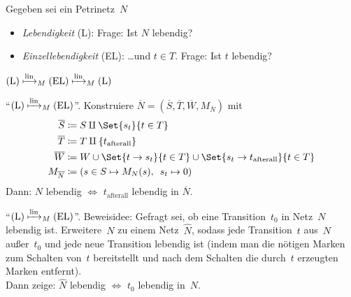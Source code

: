 \documentclass{cheat-sheet}
\newcommand{\reducesManyOneToLin}{\xmapsto{\mathrm{lin}}_M} %
\begin{document}
\begin{probleme}
  Gegeben sei ein Petrinetz~$N$
  \begin{itemize}
    \item \emph{Lebendigkeit} (L): 
      Frage: Ist $N$ lebendig?
    \item \emph{Einzellebendigkeit} (EL):
      \ldots und $t \in T$.
      Frage: Ist $t$ lebendig?
  \end{itemize}
\end{probleme}


\begin{satz}
  $\text{(L)} \reducesManyOneToLin \text{(EL)} \reducesManyOneToLin \text{(L)}$
\end{satz}

\begin{beweis}
  "`$\text{(L)} \reducesManyOneToLin \text{(EL)}$"'.
  Konstruiere $\overline{N} = (\overline{S}, \overline{T}, \overline{W}, M_{\overline{N}})$ mit
  \begin{align*}
    \overline{S} & \coloneqq S \amalg \Set{s_t}{t \in T} \\
    \overline{T} & \coloneqq T \amalg \{ t_\mathrm{afterall} \} \\
    \overline{W} & \coloneqq W \cup \Set{t \to s_t}{t \in T} \cup \Set{s_t \to t_\mathrm{afterall}}{t \in T} \\
    M_{\overline{N}} & \coloneqq (s \in S \mapsto M_N(s), \enspace s_t \mapsto 0)
  \end{align*}
  Dann: $N$ lebendig $\iff$ $t_\mathrm{afterall}$ lebendig in $\overline{N}$.
  
  \begin{center}\end{center}

  "`$\text{(L)} \reducesManyOneToLin \text{(EL)}$"'.
  Beweisidee: 
  Gefragt sei, ob eine Transition~$t_0$ in Netz~$N$ lebendig ist.
  Erweitere~$N$ zu einem Netz~$\hat{N}$, sodass jede Transition~$t$ aus~$N$ außer~$t_0$ und jede neue Transition lebendig ist (indem man die nötigen Marken zum Schalten von~$t$ bereitstellt und nach dem Schalten die durch~$t$ erzeugten Marken entfernt). \\
  Dann zeige: \enspace $\hat{N}$ lebendig $\iff$ $t_0$ lebendig in~$N$.
\end{beweis}
\end{document}
